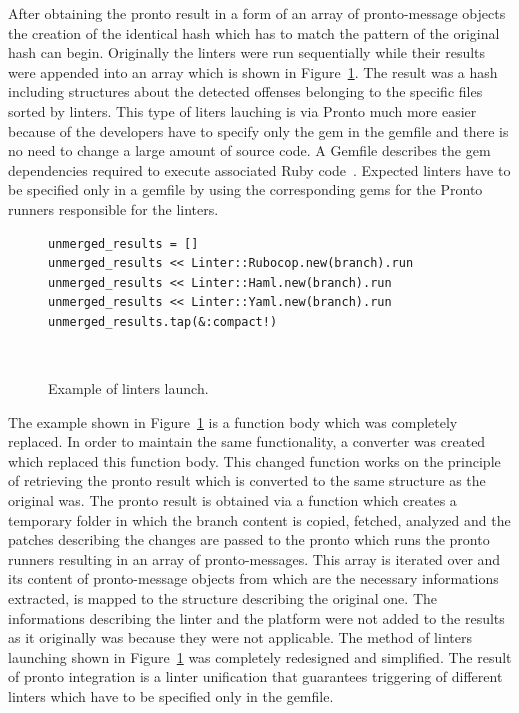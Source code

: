 After obtaining the pronto result in a form of an array of pronto-message objects the creation of the identical hash which has to match the pattern of the original hash can begin. Originally the linters were run sequentially while their results were appended into an array which is shown in Figure~\ref{fig:run_all_linters}. The result was a hash including structures about the detected offenses belonging to the specific files sorted by linters. This type of liters lauching is via Pronto much more easier because of the developers have to specify only the gem in the gemfile and there is no need to change a large amount of source code. A Gemfile describes the gem dependencies required to execute associated Ruby code~\cite{Gemfile}. Expected linters have to be specified only in a gemfile by using the corresponding gems for the Pronto runners responsible for the linters.

\begin{figure}[H]
\begin{lstlisting}[basicstyle=\scriptsize, xleftmargin=.27\textwidth]
unmerged_results = []
unmerged_results << Linter::Rubocop.new(branch).run
unmerged_results << Linter::Haml.new(branch).run
unmerged_results << Linter::Yaml.new(branch).run
unmerged_results.tap(&:compact!)
\end{lstlisting}
\hfill\\[-3em]
\caption{Example of linters launch.}
\label{fig:run_all_linters}
\end{figure}

The example shown in Figure~\ref{fig:run_all_linters} is a function body which was completely replaced. In order to maintain the same functionality, a converter was created which replaced this function body. This changed function works on the principle of retrieving the pronto result which is converted to the same structure as the original was. The pronto result is obtained via a function which creates a temporary folder in which the branch content is copied, fetched, analyzed and the patches describing the changes are passed to the pronto which runs the pronto runners resulting in an array of pronto-messages. This array is iterated over and its content of pronto-message objects from which are the necessary informations extracted, is mapped to the structure describing the original one. The informations describing the linter and the platform were not added to the results as it originally was because they were not applicable. The method of linters launching shown in Figure~\ref{fig:run_all_linters} was completely redesigned and simplified. The result of pronto integration is a linter unification that guarantees triggering of different linters which have to be specified only in the gemfile.\\

